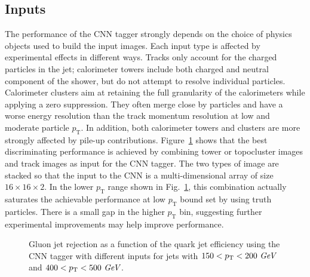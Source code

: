 \subsection{Inputs}

The performance of the CNN tagger strongly depends on the choice of physics objects used to build the input images.
Each input type is affected by experimental effects in different ways. 
Tracks only account for the charged particles in the jet; 
calorimeter towers include both charged and neutral component of the shower, but do not attempt to resolve individual particles. 
Calorimeter clusters aim at retaining the full granularity of the calorimeters while applying a zero suppression. 
They often merge close by particles and have a worse energy resolution than the track momentum resolution at low 
and moderate particle $p_\text{T}$.
In addition, both calorimeter towers and clusters are more strongly affected by pile-up contributions.
Figure~\ref{fig:cnn-input} shows that the best discriminating performance is achieved by combining tower or topocluster images and track images as input for the CNN tagger.
The two types of image are stacked so that the input to the CNN is a multi-dimensional array of size $16\times 16\times 2$.
In the lower $p_\text{T}$ range shown in Fig.~\ref{fig:cnn-input}, this combination actually saturates the achievable performance at low $p_\text{T}$ bound set by using truth particles.  
There is a small gap in the higher $p_\text{T}$ bin, suggesting further experimental improvements may help improve performance. 

\begin{figure}[htpb]
\begin{center}
\caption{Gluon jet rejection as a function of the quark jet efficiency using the CNN tagger with different inputs
for jets with \protect{} $150<p_{{\rm T}}<200~\textit{GeV}$ and \protect{} $400<p_{{\rm T}}<500~\textit{GeV}$.}
\label{fig:cnn-input}
\end{center}
\end{figure}

